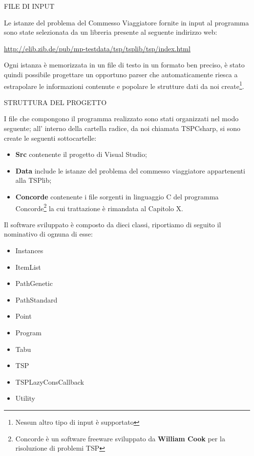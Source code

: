 \documentclass[11pt]{article}
\begin{document}
\vspace{2\baselineskip}
FILE DI INPUT
\vspace{2\baselineskip}


Le istanze del problema del Commesso Viaggiatore fornite in input al programma sono state selezionata da un libreria presente al seguente indirizzo web: 

\begin{center}
\href{http://elib.zib.de/pub/mp-testdata/tsp/tsplib/tsp/index.html}{http://elib.zib.de/pub/mp-testdata/tsp/tsplib/tsp/index.html}
\end{center}

Ogni istanza è memorizzata in un file di testo in un formato ben preciso, \`e stato quindi possibile progettare un opportuno parser che automaticamente riesca a estrapolare le informazioni contenute e popolare le strutture dati da noi create\footnote{Nessun altro tipo di input è supportato}. 

\vspace{2\baselineskip}



\vspace{2\baselineskip}
STRUTTURA DEL PROGETTO
\vspace{2\baselineskip}


I file che compongono il programma realizzato sono stati organizzati nel modo seguente; all' interno della cartella radice, da noi chiamata TSPCsharp, si sono create le seguenti sottocartelle:

\begin{itemize}
\item \textbf{Src} contenente il progetto di Visual Studio;
\item \textbf{Data} include le istanze del problema del commesso viaggiatore appartenenti alla TSPlib;
\item \textbf{Concorde} contenente i file sorgenti in linguaggio C del programma Concorde\footnote{Concorde è un software freeware sviluppato da \textbf{William Cook} per la risoluzione di problemi TSP} la cui trattazione \`e rimandata al Capitolo X.
\end{itemize}

Il software sviluppato \`e composto da dieci classi, riportiamo di seguito il nominativo di ognuna di esse:

\begin{itemize}
\item Instances
\item ItemList
\item PathGenetic
\item PathStandard
\item Point
\item Program
\item Tabu
\item TSP
\item TSPLazyConsCallback
\item Utility
\end{itemize}
\end{document}

